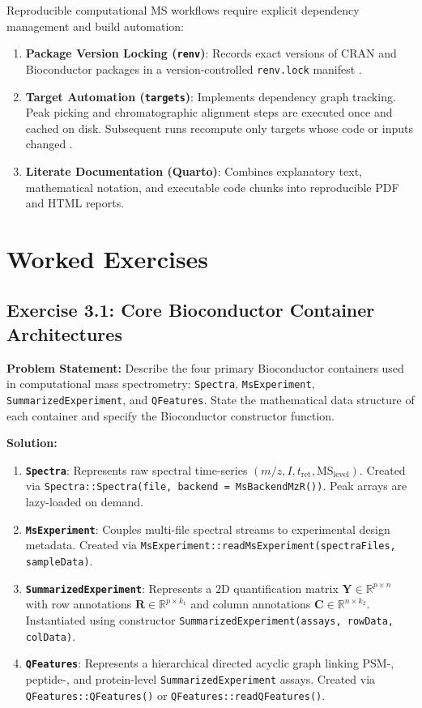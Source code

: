 \documentclass[11pt,twoside,openright]{book}
\begin{document}
Reproducible computational MS workflows require explicit dependency management and build automation:
\begin{enumerate}
\item \textbf{Package Version Locking (\texttt{renv})}: Records exact versions of CRAN and Bioconductor packages in a version-controlled \texttt{renv.lock} manifest \cite{ushey2024renv}.
\item \textbf{Target Automation (\texttt{targets})}: Implements dependency graph tracking. Peak picking and chromatographic alignment steps are executed once and cached on disk. Subsequent runs recompute only targets whose code or inputs changed \cite{landau2021targets}.
\item \textbf{Literate Documentation (Quarto)}: Combines explanatory text, mathematical notation, and executable code chunks into reproducible PDF and HTML reports.
\end{enumerate}

\FloatBarrier
\section{Worked Exercises}
\label{sec:worked_exercises}

\subsection*{Exercise 3.1: Core Bioconductor Container Architectures}
\noindent\textbf{Problem Statement:}\enspace
Describe the four primary Bioconductor containers used in computational mass spectrometry: \texttt{Spectra}, \texttt{MsExperiment}, \texttt{SummarizedExperiment}, and \texttt{QFeatures}. State the mathematical data structure of each container and specify the Bioconductor constructor function.

\noindent\textbf{Solution:}\enspace
\begin{enumerate}
\item \textbf{\texttt{Spectra}}: Represents raw spectral time-series $(m/z, I, t_{\text{ret}}, \text{MS}_{\text{level}})$. Created via \texttt{Spectra::Spectra(file, backend = MsBackendMzR())}. Peak arrays are lazy-loaded on demand.
\item \textbf{\texttt{MsExperiment}}: Couples multi-file spectral streams to experimental design metadata. Created via \texttt{MsExperiment::readMsExperiment(spectraFiles, sampleData)}.
\item \textbf{\texttt{SummarizedExperiment}}: Represents a 2D quantification matrix $\mathbf{Y} \in \mathbb{R}^{p \times n}$ with row annotations $\mathbf{R} \in \mathbb{R}^{p \times k_1}$ and column annotations $\mathbf{C} \in \mathbb{R}^{n \times k_2}$. Instantiated using constructor \texttt{SummarizedExperiment(}\allowbreak\texttt{assays, rowData, colData)}.
\item \textbf{\texttt{QFeatures}}: Represents a hierarchical directed acyclic graph linking PSM-, peptide-, and protein-level \texttt{SummarizedExperiment} assays. Created via \texttt{QFeatures::QFeatures()} or \texttt{QFeatures::readQFeatures()}.
\end{enumerate}
\end{document}
